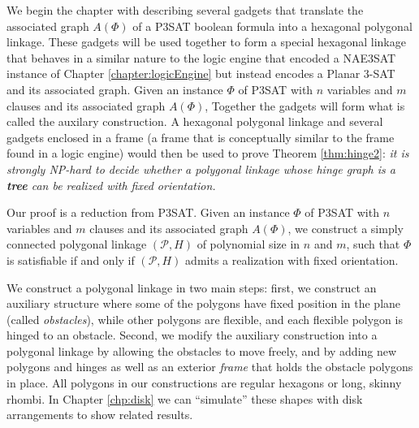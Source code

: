 \documentclass[10pt]{CSUNthesis}
\theoremstyle{plain}%
\theoremstyle{definition}
\theoremstyle{remark}
\renewcommand{\PP}{{\mathcal{P}}} %
\begin{document}
We begin the chapter with describing several gadgets that translate the associated graph $A(\Phi)$ of a P3SAT boolean formula into a hexagonal polygonal linkage.  
These gadgets will be used together to form a special hexagonal linkage that behaves in a similar nature to the logic engine that encoded a NAE3SAT instance of Chapter \ref{chapter:logicEngine} but instead encodes a Planar 3-SAT and its associated graph.  
Given an instance $\Phi$ of P3SAT with $n$ variables and $m$ clauses and its associated graph $A(\Phi)$, 
Together the gadgets will form what is called the auxilary construction.
A hexagonal polygonal linkage and several gadgets enclosed in a frame (a frame that is conceptually similar to the frame found in a logic engine) would then be used to prove Theorem \ref{thm:hinge2}: \textit{it is strongly NP-hard to decide whether a polygonal linkage whose hinge graph is a \textbf{tree} can be realized with fixed orientation.}

Our proof is a reduction from P3SAT.
Given an instance $\Phi$ of P3SAT with $n$ variables and $m$ clauses and its associated graph $A(\Phi)$, we construct a simply connected polygonal linkage $(\PP,H)$ of polynomial size in $n$ and $m$, such that $\Phi$ is satisfiable if and only if $(\PP,H)$ admits a realization with fixed orientation. 


We construct a polygonal linkage in two main steps: first, we construct an auxiliary structure where some of the polygons have fixed position in the plane (called \emph{obstacles}), while other polygons are flexible, and each flexible polygon is hinged to an obstacle. 
Second, we modify the auxiliary construction into a polygonal linkage by allowing the obstacles to move freely, and by adding new polygons and hinges as well as an exterior \emph{frame} that holds the obstacle polygons in place.
All polygons in our constructions are regular hexagons or long, skinny rhombi.
In Chapter \ref{chp:disk} we can ``simulate'' these shapes with disk arrangements to show related results.
\end{document}
